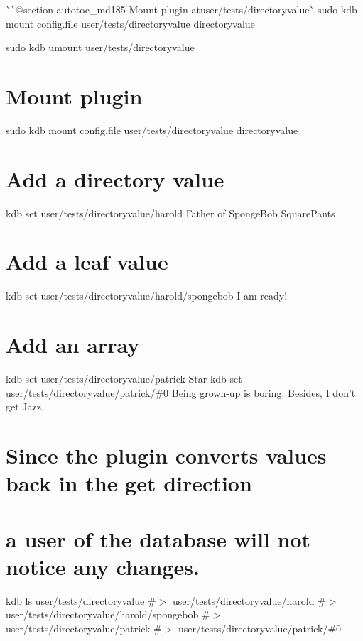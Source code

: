 \`{}\`{}{\ttfamily  @section autotoc\+\_\+md185 Mount plugin at}user/tests/directoryvalue\`{} sudo kdb mount config.\+file user/tests/directoryvalue directoryvalue 
\begin{DoxyCode}{0}
\end{DoxyCode}
 sudo kdb umount user/tests/directoryvalue 
\begin{DoxyCode}{0}
\DoxyCodeLine{}
\end{DoxyCode}
 \hypertarget{autotoc_md181_autotoc_md186}{}\section{Mount plugin}\label{autotoc_md181_autotoc_md186}
sudo kdb mount config.\+file user/tests/directoryvalue directoryvalue\hypertarget{autotoc_md181_autotoc_md187}{}\section{Add a directory value}\label{autotoc_md181_autotoc_md187}
kdb set user/tests/directoryvalue/harold \textquotesingle{}Father of Sponge\+Bob Square\+Pants\textquotesingle{} \hypertarget{autotoc_md181_autotoc_md188}{}\section{Add a leaf value}\label{autotoc_md181_autotoc_md188}
kdb set user/tests/directoryvalue/harold/spongebob \textquotesingle{}I am ready!\textquotesingle{}\hypertarget{autotoc_md181_autotoc_md189}{}\section{Add an array}\label{autotoc_md181_autotoc_md189}
kdb set user/tests/directoryvalue/patrick Star kdb set user/tests/directoryvalue/patrick/\#0 \textquotesingle{}Being grown-\/up is boring. Besides, I don’t get Jazz.\textquotesingle{}\hypertarget{autotoc_md181_autotoc_md190}{}\section{Since the plugin converts values back in the get direction}\label{autotoc_md181_autotoc_md190}
\hypertarget{autotoc_md181_autotoc_md191}{}\section{a user of the database will not notice any changes.}\label{autotoc_md181_autotoc_md191}
kdb ls user/tests/directoryvalue \#$>$ user/tests/directoryvalue/harold \#$>$ user/tests/directoryvalue/harold/spongebob \#$>$ user/tests/directoryvalue/patrick \#$>$ user/tests/directoryvalue/patrick/\#0

